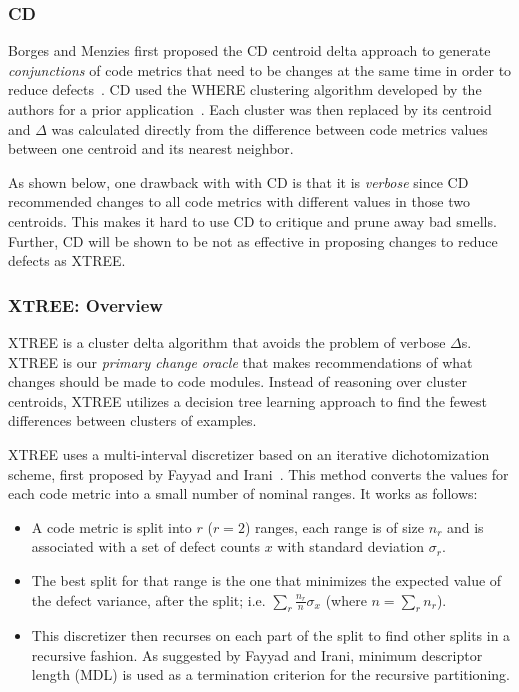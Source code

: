 \documentclass[twocolumn,5p]{elsarticle}
\theoremstyle{break}
\begin{document}
	
	
	\subsubsection{CD}\label{sec:cdcd}
	Borges and Menzies first proposed the CD centroid delta approach to
	generate {\em conjunctions} of code metrics
	that need to be changes at the same time
	in order to reduce defects~\cite{me12c}.
	CD used the WHERE clustering algorithm developed by the
	authors for a prior application~\cite{localvsglobal}.
	Each cluster was then replaced by its centroid
	and $\Delta$ was calculated directly from the difference
	between code metrics values between one centroid
	and its nearest neighbor.
	
	
	As shown below, one drawback with with CD is that it is {\em verbose}
	since
	CD   recommended changes to all code
	metrics with different values in those two centroids. 
	This makes it hard to use CD to   critique and prune away bad smells. Further, CD will be shown to be
	not as effective
	in proposing changes to reduce defects as XTREE.
	
	\subsubsection{XTREE: Overview}
	
	XTREE  is a cluster delta algorithm
	that avoids the problem of verbose $\Delta$s.
	XTREE is our {\em primary change oracle} that makes recommendations 
	of what changes should be made to code modules.
	Instead of reasoning over cluster centroids,
	XTREE utilizes a decision tree learning approach
	to find the fewest differences between clusters of examples.
	
	
	XTREE uses a multi-interval discretizer based on an iterative dichotomization scheme, first proposed by Fayyad and Irani~\cite{fi}. This method converts the values for each code metric into a small number of nominal ranges. It works as follows:
	\begin{itemize}
		\item A code metric is split into $r$ ($r=2$) ranges, each range is of
		size $n_r$ and is associated with a set of defect counts $x$ with standard deviation
		$\sigma_r$. 
		\item The best split for that range is the one that minimizes the expected value of the
		defect variance, after the split; i.e. $\sum_r\frac{n_r}{n}\sigma_x$ (where $n=\sum_r n_r$). 
		\item This discretizer then recurses on each part of the split to find other splits in a recursive fashion. As suggested by Fayyad and Irani, minimum descriptor length (MDL) is used as a termination criterion for the recursive partitioning.
	\end{itemize}
	
\end{document}
